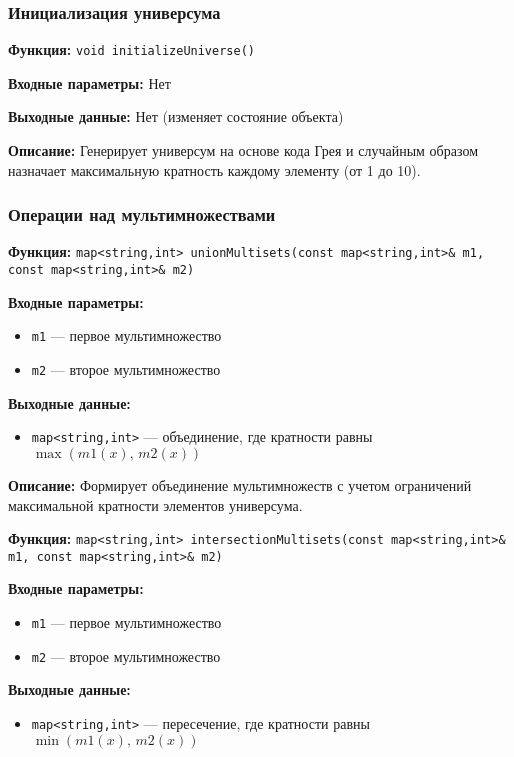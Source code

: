 \documentclass[12pt,a4paper]{article}
\begin{document}
\subsubsection{Инициализация универсума}

\textbf{Функция:} \texttt{void initializeUniverse()}

\textbf{Входные параметры:} Нет

\textbf{Выходные данные:} Нет (изменяет состояние объекта)

\textbf{Описание:} Генерирует универсум на основе кода Грея и случайным образом назначает максимальную кратность каждому элементу (от 1 до 10).

\subsubsection{Операции над мультимножествами}

\textbf{Функция:} \texttt{map<string,int> unionMultisets(const map<string,int>\& m1, const map<string,int>\& m2)}

\textbf{Входные параметры:}
\begin{itemize}
    \item \texttt{m1} — первое мультимножество
    \item \texttt{m2} — второе мультимножество
\end{itemize}

\textbf{Выходные данные:}
\begin{itemize}
    \item \texttt{map<string,int>} — объединение, где кратности равны $\max(m1(x),\,m2(x))$
\end{itemize}

\textbf{Описание:} Формирует объединение мультимножеств с учетом ограничений максимальной кратности элементов универсума.

\vspace{6pt}

\textbf{Функция:} \texttt{map<string,int> intersectionMultisets(const map<string,int>\& m1, const map<string,int>\& m2)}

\textbf{Входные параметры:}
\begin{itemize}
    \item \texttt{m1} — первое мультимножество
    \item \texttt{m2} — второе мультимножество
\end{itemize}

\textbf{Выходные данные:}
\begin{itemize}
    \item \texttt{map<string,int>} — пересечение, где кратности равны $\min(m1(x),\,m2(x))$
\end{itemize}
\end{document}
